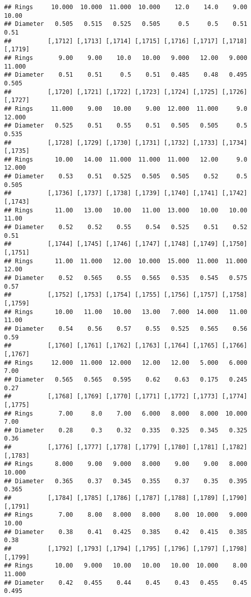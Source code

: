 \documentclass[
]{article}
\begin{document}
\begin{verbatim}
## Rings     10.000  10.000  11.000  10.000    12.0    14.0    9.00   10.00
## Diameter   0.505   0.515   0.525   0.505     0.5     0.5    0.51    0.51
##          [,1712] [,1713] [,1714] [,1715] [,1716] [,1717] [,1718] [,1719]
## Rings       9.00    9.00    10.0   10.00   9.000   12.00   9.000  11.000
## Diameter    0.51    0.51     0.5    0.51   0.485    0.48   0.495   0.505
##          [,1720] [,1721] [,1722] [,1723] [,1724] [,1725] [,1726] [,1727]
## Rings     11.000    9.00   10.00    9.00  12.000  11.000     9.0  12.000
## Diameter   0.525    0.51    0.55    0.51   0.505   0.505     0.5   0.535
##          [,1728] [,1729] [,1730] [,1731] [,1732] [,1733] [,1734] [,1735]
## Rings      10.00   14.00  11.000  11.000  11.000   12.00     9.0  12.000
## Diameter    0.53    0.51   0.525   0.505   0.505    0.52     0.5   0.505
##          [,1736] [,1737] [,1738] [,1739] [,1740] [,1741] [,1742] [,1743]
## Rings      11.00   13.00   10.00   11.00  13.000   10.00   10.00   11.00
## Diameter    0.52    0.52    0.55    0.54   0.525    0.51    0.52    0.51
##          [,1744] [,1745] [,1746] [,1747] [,1748] [,1749] [,1750] [,1751]
## Rings      11.00  11.000   12.00  10.000  15.000  11.000  11.000   12.00
## Diameter    0.52   0.565    0.55   0.565   0.535   0.545   0.575    0.57
##          [,1752] [,1753] [,1754] [,1755] [,1756] [,1757] [,1758] [,1759]
## Rings      10.00   11.00   10.00   13.00   7.000  14.000   11.00   11.00
## Diameter    0.54    0.56    0.57    0.55   0.525   0.565    0.56    0.59
##          [,1760] [,1761] [,1762] [,1763] [,1764] [,1765] [,1766] [,1767]
## Rings     12.000  11.000  12.000   12.00   12.00   5.000   6.000    7.00
## Diameter   0.565   0.565   0.595    0.62    0.63   0.175   0.245    0.27
##          [,1768] [,1769] [,1770] [,1771] [,1772] [,1773] [,1774] [,1775]
## Rings       7.00     8.0    7.00   6.000   8.000   8.000  10.000    7.00
## Diameter    0.28     0.3    0.32   0.335   0.325   0.345   0.325    0.36
##          [,1776] [,1777] [,1778] [,1779] [,1780] [,1781] [,1782] [,1783]
## Rings      8.000    9.00   9.000   8.000    9.00    9.00   8.000  10.000
## Diameter   0.365    0.37   0.345   0.355    0.37    0.35   0.395   0.365
##          [,1784] [,1785] [,1786] [,1787] [,1788] [,1789] [,1790] [,1791]
## Rings       7.00    8.00   8.000   8.000    8.00  10.000   9.000   10.00
## Diameter    0.38    0.41   0.425   0.385    0.42   0.415   0.385    0.38
##          [,1792] [,1793] [,1794] [,1795] [,1796] [,1797] [,1798] [,1799]
## Rings      10.00   9.000   10.00   10.00   10.00  10.000    8.00  11.000
## Diameter    0.42   0.455    0.44    0.45    0.43   0.455    0.45   0.495

\end{verbatim}
\end{document}
